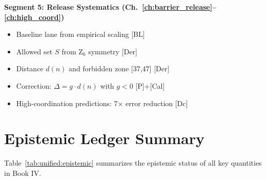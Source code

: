 \textbf{Segment 5: Release Systematics (Ch.~\ref{ch:barrier_release}--\ref{ch:high_coord})}
\begin{itemize}
    \item Baseline lane from empirical scaling [BL]
    \item Allowed set $S$ from Z$_6$ symmetry [Der]
    \item Distance $d(n)$ and forbidden zone [37,47] [Der]
    \item Correction: $\Delta = g \cdot d(n)$ with $g < 0$ [P]+[Cal]
    \item High-coordination predictions: 7$\times$ error reduction [Dc]
\end{itemize}

\section{Epistemic Ledger Summary}
\label{sec:unified:epistemic}

Table~\ref{tab:unified:epistemic} summarizes the epistemic status of all
key quantities in Book IV.

